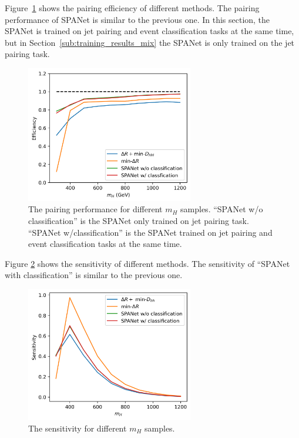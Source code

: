 \documentclass[12pt]{article}
\begin{document}
		Figure~\ref{fig:pairing_performance_mass_cls} shows the pairing efficiency of different methods. The pairing performance of SPANet is similar to the previous one. In this section, the SPANet is trained on jet pairing and event classification tasks at the same time, but in Section~\ref{sub:training_results_mix} the SPANet is only trained on the jet pairing task.
		\begin{figure}[htpb]
			\centering
			\includegraphics[width=0.65\textwidth]{pairing_efficiency_resonant-DHH-mindR-SPANet2-cls.png}
			\caption{The pairing performance for different $m_H$ samples. ``SPANet w/o classification'' is the SPANet only trained on jet pairing task. ``SPANet w/classification'' is the SPANet trained on jet pairing and event classification tasks at the same time.}
			\label{fig:pairing_performance_mass_cls}
		\end{figure}

		Figure \ref{fig:sensitivity_mass_cls} shows the sensitivity of different methods. The sensitivity of ``SPANet with classification'' is similar to the previous one.
		\begin{figure}[htpb]
			\centering
			\includegraphics[width=0.65\textwidth]{sensitivity_mass-DHH_mindR-SPANet-cls.png}
			\caption{The sensitivity for different $m_H$ samples.}
			\label{fig:sensitivity_mass_cls}
		\end{figure}
\end{document}
